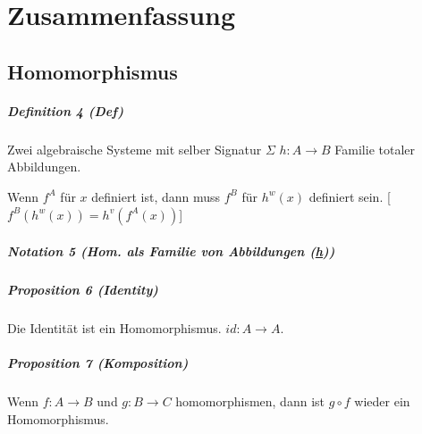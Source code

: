 




\pagestyle{scrheadings}

%

\setcounter{page}{1}
\tableofcontents 
\newpage


\setcounter{chapter}{0}
\setcounter{secnumdepth}{2}
\setcounter{page}{1} 



\chapter{Zusammenfassung}


\section{Homomorphismus}
\paragraph{Definition 4 (Def)}
Zwei algebraische Systeme mit selber Signatur $\Sigma$ $h: A \rightarrow B$ Familie totaler Abbildungen.

Wenn $f^A$ für $x$ definiert ist, dann muss $f^B$ für $h^w(x)$ definiert sein.
[$f^B(h^w(x)) = h^v(f^A(x))$]

\paragraph{Notation 5 (Hom. als Familie von Abbildungen (\underline{h}))}

\paragraph{Proposition 6 (Identity)}

Die Identität ist ein Homomorphismus. $id: A \rightarrow A$.

\paragraph{Proposition 7 (Komposition)}
Wenn $f: A \rightarrow B$ und $g: B \rightarrow C$ homomorphismen, dann ist $g \circ f$ wieder ein Homomorphismus.

